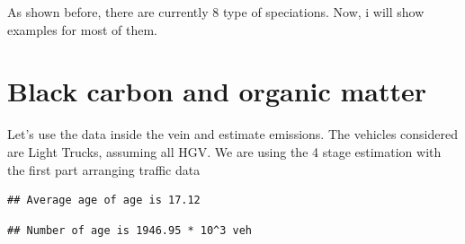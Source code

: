 \documentclass[12pt,graybox,envcountchap,sectrefs]{krantz}
\makeatletter
\newenvironment{Shaded}{\begin{snugshade}}{\end{snugshade}}
\newcommand{\KeywordTok}[1]{\textcolor[rgb]{0.13,0.29,0.53}{\textbf{#1}}}
\newcommand{\StringTok}[1]{\textcolor[rgb]{0.31,0.60,0.02}{#1}}
\newcommand{\CommentTok}[1]{\textcolor[rgb]{0.56,0.35,0.01}{\textit{#1}}}
\newcommand{\OperatorTok}[1]{\textcolor[rgb]{0.81,0.36,0.00}{\textbf{#1}}}
\newcommand{\NormalTok}[1]{#1}
\newenvironment{kframe}{%
\medskip{}
\setlength{\fboxsep}{.8em}
 \def\at@end@of@kframe{}%
 \ifinner\ifhmode%
  \def\at@end@of@kframe{\end{minipage}}%
  \begin{minipage}{\columnwidth}%
 \fi\fi%
 \def\FrameCommand##1{\hskip\@totalleftmargin \hskip-\fboxsep
 \colorbox{shadecolor}{##1}\hskip-\fboxsep
     \hskip-\linewidth \hskip-\@totalleftmargin \hskip\columnwidth}%
 \MakeFramed {\advance\hsize-\width
   \@totalleftmargin\z@ \linewidth\hsize
   \@setminipage}}%
 {\par\unskip\endMakeFramed%
 \at@end@of@kframe}
\renewenvironment{Shaded}{\begin{kframe}}{\end{kframe}}
\theoremstyle{definition}
\theoremstyle{definition}
\theoremstyle{definition}
\theoremstyle{remark}
\makeatother
\begin{document}
As shown before, there are currently 8 type of speciations. Now, i will
show examples for most of them.

\section{Black carbon and organic
matter}\label{black-carbon-and-organic-matter}

Let's use the data inside the vein and estimate emissions. The vehicles
considered are Light Trucks, assuming all HGV. We are using the 4 stage
estimation with the first part arranging traffic data

\begin{Shaded}
\end{Shaded}

\begin{verbatim}
## Average age of age is 17.12
\end{verbatim}

\begin{verbatim}
## Number of age is 1946.95 * 10^3 veh
\end{verbatim}
\end{document}
